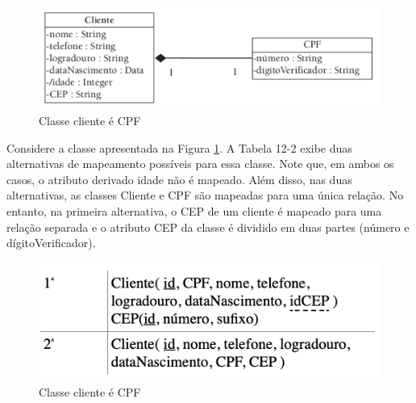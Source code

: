 \begin{figure}[H]
	\centering
	\includegraphics[scale=0.6]{imagens/mapeamento01.png}
	\caption{Classe cliente é CPF}
	\label{fig:figura-01-banco-02}
\end{figure}

Considere a classe apresentada na Figura \ref{fig:figura-01-banco-02}. A Tabela 12-2 exibe duas alternativas de mapeamento possíveis para essa classe. Note que, em ambos os casos, o atributo derivado idade não é mapeado. Além disso, nas duas alternativas, as classes Cliente e CPF são mapeadas para uma única relação. No entanto, na primeira alternativa, o CEP de um cliente é mapeado para uma relação separada e o atributo CEP da classe é dividido em duas partes (número e dígitoVerificador).

\begin{figure}[H]
	\centering
	\includegraphics[scale=0.6]{imagens/mapeamento02.png}
	\caption{Classe cliente é CPF}
	\label{fig:figura-01-banco-03}
\end{figure}